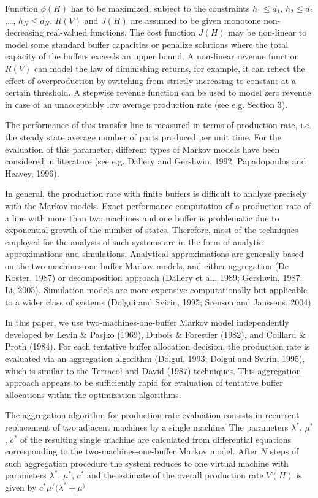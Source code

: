 \documentclass{ifacconf}
\begin{document}
Function $\phi(H)$ has to be maximized, subject to the constraints $h_1 \leq d_1$, $h_2 \leq d_2$,…, $h_N \leq d_N$.
$R(V)$ and $J(H)$ are assumed to be given monotone non-decreasing real-valued functions. 
The cost function $J(H)$ may be non-linear to model some standard buffer capacities or 
penalize  solutions  where  the  total  capacity  of  the  buffers  exceeds  an  upper  bound. A 
non-linear revenue function $R(V)$ can model the law of diminishing returns, for example, 
it  can  reflect  the  effect  of  overproduction  by  switching  from  strictly  increasing  to 
constant at a certain threshold. A stepwise revenue function can be used to model zero 
revenue  in  case  of  an  unacceptably  low  average  production  rate  (see  e.g.  Section  3). 

The performance of this transfer line is measured in terms of production rate, i.e. the 
steady state average number of parts produced per unit time. For the evaluation of this
parameter, different types of Markov models have been considered in literature (see e.g. 
Dallery and Gershwin, 1992; Papadopoulos and Heavey, 1996). 
 
In general, the production rate with finite buffers is difficult to analyze precisely with 
the Markov models. Exact performance computation of a production rate of a line with 
more than two machines and one buffer is problematic due to exponential growth of the 
number of states. Therefore, most of the techniques employed for the analysis of such 
systems are in the form of analytic approximations and simulations. Analytical 
approximations are generally based on the two-machines-one-buffer Markov models, 
and either aggregation (De Koster, 1987) or decomposition approach (Dallery et al., 
1989; Gershwin, 1987; Li, 2005). Simulation models are more expensive 
computationally but applicable to a wider class of systems (Dolgui and Svirin, 1995; 
Srensen and Janssens, 2004). 
 
In this paper, we use two-machines-one-buffer Markov model independently developed 
by Levin $\&$ Pasjko (1969), Dubois $\&$ Forestier (1982), and Coillard $\&$ Proth (1984). For 
each tentative buffer allocation decision, the production rate is evaluated via an 
aggregation algorithm (Dolgui, 1993; Dolgui and Svirin, 1995), which is similar to the 
Terracol and David (1987) techniques. This aggregation approach appears to be 
sufficiently rapid for evaluation of tentative buffer allocations within the optimization 
algorithms.  
 
The aggregation algorithm for production rate evaluation consists in recurrent 
replacement of two adjacent machines by a single machine. The parameters $\lambda^*$, $\mu^*$, $c^*$ of 
the resulting single machine are calculated from differential equations corresponding to
the two-machines-one-buffer Markov model. After $N$ steps of such aggregation 
procedure the system reduces to one virtual machine with parameters $\lambda^*$, $\mu^*$, $c^*$ and the 
estimate of the overall production rate $V(H)$ is given by $c^*\mu^/(\lambda^*+\mu^)$
\end{document}
